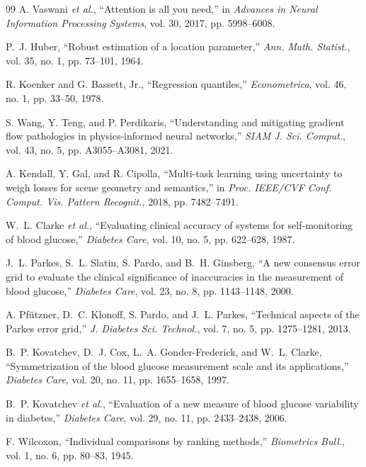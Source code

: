 \documentclass[journal]{IEEEtran}
\begin{document}
\begin{thebibliography}{99}
\label{ref38label} A. Vaswani \emph{et al.}, ``Attention is all you need,'' in \emph{Advances in Neural Information Processing Systems}, vol. 30, 2017, pp. 5998--6008.

\label{ref39label} P.~J. Huber, ``Robust estimation of a location parameter,'' \emph{Ann. Math. Statist.}, vol. 35, no. 1, pp. 73--101, 1964.

\label{ref40label} R. Koenker and G. Bassett, Jr., ``Regression quantiles,'' \emph{Econometrica}, vol. 46, no. 1, pp. 33--50, 1978.

\label{ref41label} S. Wang, Y. Teng, and P. Perdikaris, ``Understanding and mitigating gradient flow pathologies in physics-informed neural networks,'' \emph{SIAM J. Sci. Comput.}, vol. 43, no. 5, pp. A3055--A3081, 2021.

\label{ref42label} A. Kendall, Y. Gal, and R. Cipolla, ``Multi-task learning using uncertainty to weigh losses for scene geometry and semantics,'' in \emph{Proc. IEEE/CVF Conf. Comput. Vis. Pattern Recognit.}, 2018, pp. 7482--7491.

\label{ref43label} W.~L. Clarke \emph{et al.}, ``Evaluating clinical accuracy of systems for self-monitoring of blood glucose,'' \emph{Diabetes Care}, vol. 10, no. 5, pp. 622--628, 1987.

\label{ref44label} J.~L. Parkes, S.~L. Slatin, S. Pardo, and B.~H. Ginsberg, ``A new consensus error grid to evaluate the clinical significance of inaccuracies in the measurement of blood glucose,'' \emph{Diabetes Care}, vol. 23, no. 8, pp. 1143--1148, 2000.

\label{ref45label} A. Pf\"utzner, D.~C. Klonoff, S. Pardo, and J.~L. Parkes, ``Technical aspects of the Parkes error grid,'' \emph{J. Diabetes Sci. Technol.}, vol. 7, no. 5, pp. 1275--1281, 2013.

\label{ref46label} B.~P. Kovatchev, D.~J. Cox, L.~A. Gonder-Frederick, and W.~L. Clarke, ``Symmetrization of the blood glucose measurement scale and its applications,'' \emph{Diabetes Care}, vol. 20, no. 11, pp. 1655--1658, 1997.

\label{ref47label} B.~P. Kovatchev \emph{et al.}, ``Evaluation of a new measure of blood glucose variability in diabetes,'' \emph{Diabetes Care}, vol. 29, no. 11, pp. 2433--2438, 2006.

\label{ref48label} F. Wilcoxon, ``Individual comparisons by ranking methods,'' \emph{Biometrics Bull.}, vol. 1, no. 6, pp. 80--83, 1945.


\end{thebibliography}
\end{document}
